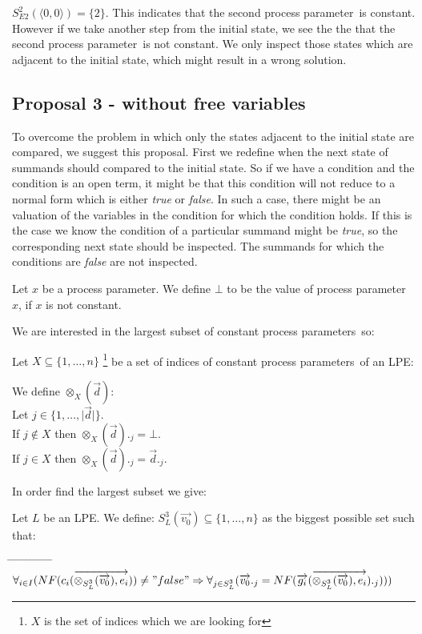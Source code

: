 \index{}\documentclass[a4paper,10pt]{article}
\theoremstyle{plain}
\theoremstyle{definition}
\newcommand{\ovr}{\overrightarrow}
\newcommand{\pp}{process parameter}
\newcommand{\pps}{process parameters}
\newcommand{\ti}{\textit}
\newcommand{\tab}{\hspace*{5.mm} \= \hspace*{5.mm} \= \hspace*{5.mm} \= \hspace*{5.mm} \= \hspace*{5.mm} \= \hspace*{5.mm}  \= \hspace*{5.mm}  \= \hspace*{5.mm}  \= \hspace*{5.mm} \= \hspace*{5.mm} \= \hspace*{5.mm}  \= \hspace*{5.mm}  \= \hspace*{5.mm}\kill}
\begin{document}
\begin{defn}
$S_{E2}^2(\langle 0,0 \rangle) = \lbrace 2 \rbrace$. This indicates that the second \pp\ is constant. However if we take another step from the initial state, we see the the that the second \pp\ is not constant. We only inspect those states which are adjacent to the initial state, which might result in a wrong solution.
\end{defn}

\subsection{Proposal 3 - without free variables}
To overcome the problem in which only the states adjacent to the initial state are compared, we suggest this proposal. First we redefine when the next state of summands should compared to the initial state. So if we have a condition and the condition is an open term, it might be that this condition will not reduce to a normal form which is either \ti{true} or \ti{false}. In such a case, there might be an valuation of the variables in the condition for which the condition holds. If this is the case we know the condition of a particular summand might be \ti{true}, so the corresponding next state should be inspected. The summands for which the conditions are \ti{false} are not inspected. \\

\begin{defn}[$\bot$] Let $x$ be a \pp . We define $\bot$ to be the value of \pp\ $x$, if $x$ is not constant. 
\end{defn}

We are interested in the largest subset of constant \pps\ so:

Let $X \subseteq \lbrace 1, \ldots, n \rbrace$ \footnote{$X$ is the set of indices which we are looking for} be a set of indices of constant \pps\ of an LPE:

\begin{defn} We define $\otimes_X(\ovr{d})$:\\
Let $j \in \lbrace 1, \dots, \vert \ovr{d} \vert \rbrace $. \\
If $j \not\in X$ then $\otimes_X(\ovr{d})._j = \bot $. \\
If $j \in X$ then $\otimes_X(\ovr{d})._j = \ovr{d}._j$.\\
\end{defn}

In order find the largest subset we give:

\begin{defn} \label{def:sug3} Let $L$ be an LPE. We define: $ S_L^3(\ovr{v_0}) \subseteq \lbrace 1, \ldots, n \rbrace $ 
 as the biggest possible set such that:\\ 
\begin{tabbing}
\tab
\> $\forall_{i \in I} (NF( c_i ( \ovr{\otimes_{S_L^3}(\ovr{v_0}), e_i} ) ) \not= "false" \Rightarrow \forall_{j \in S_L^3}(\ovr{v_0}._j =  NF( \ovr{g_i}(\ovr{\otimes_{S_L^3}(\ovr{v_0}), e_i} )._j))) $
\end{tabbing}
\end{defn}
\end{document}
